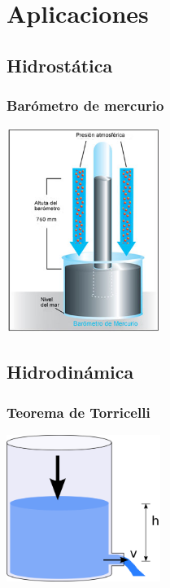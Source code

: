 \documentclass[handout]{beamer}
\begin{document}
\section{Aplicaciones}

\subsection{Hidrostática}

\begin{frame}
  \frametitle{Barómetro de mercurio}
  \begin{center}
    \includegraphics[width=5cm]{barometro}
  \end{center}
\end{frame}


\subsection{Hidrodinámica}

\begin{frame}
  \frametitle{Teorema de Torricelli}
  \begin{center}
    \includegraphics[width=5cm]{torricelli}
  \end{center}
\end{frame}
\end{document}
